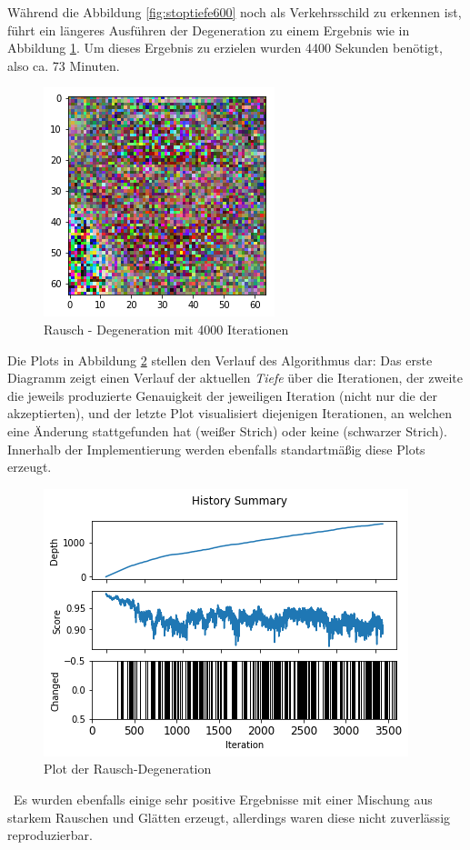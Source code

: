 Während die Abbildung \ref{fig:stoptiefe600} noch als Verkehrsschild zu erkennen ist, führt ein längeres Ausführen der Degeneration zu einem Ergebnis wie in Abbildung \ref{fig:stoptiefe4000}. Um dieses Ergebnis zu erzielen wurden 4400 Sekunden benötigt, also ca. 73 Minuten.

\begin{figure}[h]
	\centering
	\includegraphics[width=0.4\linewidth]{Images/DegenSamples/StopTiefe4000}
	\caption[Degeneration Tiefe 4000]{Rausch - Degeneration mit 4000 Iterationen}
	\label{fig:stoptiefe4000}
\end{figure}

Die Plots in Abbildung \ref{fig:plotTiefe4000} stellen den Verlauf des Algorithmus dar: Das erste Diagramm zeigt einen Verlauf der aktuellen \textit{Tiefe} über die Iterationen, der zweite die jeweils produzierte Genauigkeit der jeweiligen Iteration (nicht nur die der akzeptierten), und der letzte Plot visualisiert diejenigen Iterationen, an welchen eine Änderung stattgefunden hat (weißer Strich) oder keine (schwarzer Strich). Innerhalb der Implementierung werden ebenfalls standartmäßig diese Plots erzeugt.

\begin{figure}[h]
	\centering
	\includegraphics[width=0.6\linewidth]{Images/DegenSamples/StopTiefe4000Plot}
	\caption[Plot Degeneration]{Plot der Rausch-Degeneration}
	\label{fig:plotTiefe4000}
\end{figure}
~\newline Es wurden ebenfalls einige sehr positive Ergebnisse mit einer Mischung aus starkem Rauschen und Glätten erzeugt, allerdings waren diese nicht zuverlässig reproduzierbar. 

